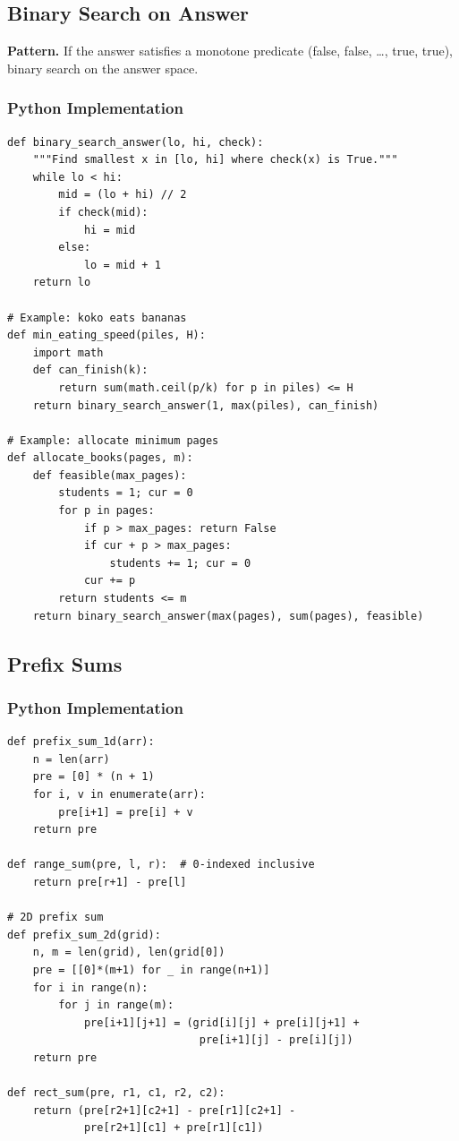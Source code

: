 \documentclass[10pt,a4paper]{article}
\theoremstyle{cpstyle}
\begin{document}
\subsection{Binary Search on Answer}

\textbf{Pattern.} If the answer satisfies a monotone predicate (false, false, \ldots, true, true), binary search on the answer space.

\subsubsection{Python Implementation}
\begin{lstlisting}[caption={Binary search on answer -- minimize maximum}]
def binary_search_answer(lo, hi, check):
    """Find smallest x in [lo, hi] where check(x) is True."""
    while lo < hi:
        mid = (lo + hi) // 2
        if check(mid):
            hi = mid
        else:
            lo = mid + 1
    return lo

# Example: koko eats bananas
def min_eating_speed(piles, H):
    import math
    def can_finish(k):
        return sum(math.ceil(p/k) for p in piles) <= H
    return binary_search_answer(1, max(piles), can_finish)

# Example: allocate minimum pages
def allocate_books(pages, m):
    def feasible(max_pages):
        students = 1; cur = 0
        for p in pages:
            if p > max_pages: return False
            if cur + p > max_pages:
                students += 1; cur = 0
            cur += p
        return students <= m
    return binary_search_answer(max(pages), sum(pages), feasible)
\end{lstlisting}

\subsection{Prefix Sums}

\subsubsection{Python Implementation}
\begin{lstlisting}[caption={Prefix Sums -- 1D, 2D, and difference arrays}]
def prefix_sum_1d(arr):
    n = len(arr)
    pre = [0] * (n + 1)
    for i, v in enumerate(arr):
        pre[i+1] = pre[i] + v
    return pre

def range_sum(pre, l, r):  # 0-indexed inclusive
    return pre[r+1] - pre[l]

# 2D prefix sum
def prefix_sum_2d(grid):
    n, m = len(grid), len(grid[0])
    pre = [[0]*(m+1) for _ in range(n+1)]
    for i in range(n):
        for j in range(m):
            pre[i+1][j+1] = (grid[i][j] + pre[i][j+1] +
                              pre[i+1][j] - pre[i][j])
    return pre

def rect_sum(pre, r1, c1, r2, c2):
    return (pre[r2+1][c2+1] - pre[r1][c2+1] -
            pre[r2+1][c1] + pre[r1][c1])
\end{lstlisting}
\end{document}

